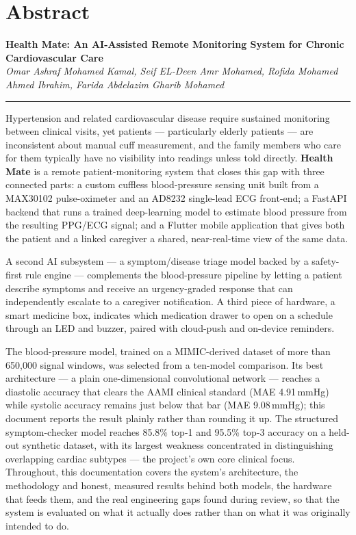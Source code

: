\documentclass[12pt,a4paper]{report}
\begin{document}
\chapter*{Abstract}
\thispagestyle{fancy}

\noindent\textbf{\large Health Mate: An AI-Assisted Remote Monitoring System for Chronic Cardiovascular Care}\\[0.2cm]
\textit{\small Omar Ashraf Mohamed Kamal, Seif EL-Deen Amr Mohamed, Rofida Mohamed Ahmed Ibrahim, Farida Abdelazim Gharib Mohamed}
\vspace{0.5cm}
\hrule
\vspace{0.5cm}

Hypertension and related cardiovascular disease require sustained monitoring
between clinical visits, yet patients --- particularly elderly patients ---
are inconsistent about manual cuff measurement, and the family members who
care for them typically have no visibility into readings unless told directly.
\textbf{Health Mate} is a remote patient-monitoring system that closes this gap
with three connected parts: a custom cuffless blood-pressure sensing unit built
from a MAX30102 pulse-oximeter and an AD8232 single-lead ECG front-end; a
FastAPI backend that runs a trained deep-learning model to estimate blood
pressure from the resulting PPG/ECG signal; and a Flutter mobile application
that gives both the patient and a linked caregiver a shared, near-real-time
view of the same data.

A second AI subsystem --- a symptom/disease triage model backed by a
safety-first rule engine --- complements the blood-pressure pipeline by letting
a patient describe symptoms and receive an urgency-graded response that can
independently escalate to a caregiver notification. A third piece of hardware,
a smart medicine box, indicates which medication drawer to open on a schedule
through an LED and buzzer, paired with cloud-push and on-device reminders.

The blood-pressure model, trained on a MIMIC-derived dataset of more than
650{,}000 signal windows, was selected from a ten-model comparison. Its best
architecture --- a plain one-dimensional convolutional network --- reaches a
diastolic accuracy that clears the AAMI clinical standard
(MAE 4.91\,mmHg) while systolic accuracy remains just below that bar
(MAE 9.08\,mmHg); this document reports the result plainly rather than rounding
it up. The structured symptom-checker model reaches 85.8\% top-1 and 95.5\%
top-3 accuracy on a held-out synthetic dataset, with its largest weakness
concentrated in distinguishing overlapping cardiac subtypes --- the project's
own core clinical focus. Throughout, this documentation covers the system's
architecture, the methodology and honest, measured results behind both models,
the hardware that feeds them, and the real engineering gaps found during
review, so that the system is evaluated on what it actually does rather than on
what it was originally intended to do.
\end{document}
